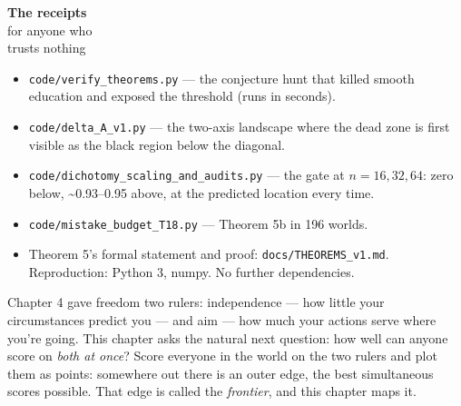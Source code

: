 \begin{receipts}{\textbf{The receipts}\\for anyone who\\trusts nothing}


\begin{itemize}
\tightlist
\item
  \texttt{code/\allowbreak{}verify\_\allowbreak{}theorems.\allowbreak{}py} --- the conjecture hunt that killed smooth
  education and exposed the threshold (runs in seconds).
\item
  \texttt{code/\allowbreak{}delta\_\allowbreak{}A\_\allowbreak{}v1.\allowbreak{}py} --- the two-axis landscape where the dead zone is
  first visible as the black region below the diagonal.
\item
  \texttt{code/\allowbreak{}dichotomy\_\allowbreak{}scaling\_\allowbreak{}and\_\allowbreak{}audits.\allowbreak{}py} --- the gate at \(n = 16, 32, 64\):
  zero below, \textasciitilde0.93--0.95 above, at the predicted location every time.
\item
  \texttt{code/\allowbreak{}mistake\_\allowbreak{}budget\_\allowbreak{}T18.\allowbreak{}py} --- Theorem 5b in 196 worlds.
\item
  Theorem 5's formal statement and proof: \texttt{docs/\allowbreak{}THEOREMS\_\allowbreak{}v1.\allowbreak{}md}.
  Reproduction: Python 3, numpy. No further dependencies.
\end{itemize}

\end{receipts}




Chapter 4 gave freedom two rulers: independence --- how little your
circumstances predict you --- and aim --- how much your actions serve where
you're going. This chapter asks the natural next question: how well can
anyone score on \emph{both at once}? Score everyone in the world on the two
rulers and plot them as points: somewhere out there is an outer edge,
the best simultaneous scores possible. That edge is called the
\emph{frontier}, and this chapter maps it.

